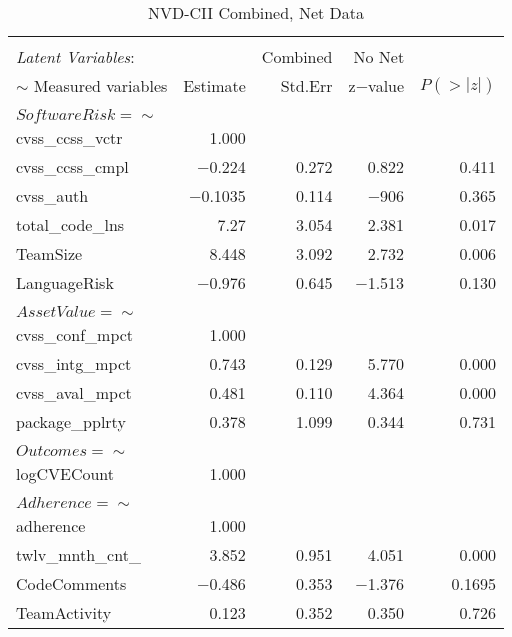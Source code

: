 \begin{table}
	\begin{center}	
		\caption{NVD-CII Combined, Net Data}
		\label{tab:results_combined2}
		\begin{tabular}{l|rrrr}
			\\[-1.8ex]\hline 
			\hline \\[-1.8ex] 
			\textit{Latent Variables}: &  & Combined & No Net & \\  
			$\sim$ Measured variables& Estimate & Std.Err & z$-$value & $P(>|z|)$ \\
			\hline \\[-1.8ex]
			$SoftwareRisk =\sim$  & & & & \\                                   
			cvss\_ccss\_vctr   & 1.000 & &  & \\                             
			cvss\_ccss\_cmpl &  $-$0.224 &   0.272 & 0.822 &   0.411\\
			cvss\_auth     &   $-$0.1035  &  0.114  & $-$906   & 0.365\\
			total\_code\_lns  &  7.27 &   3.054 &   2.381 &   0.017\\
			TeamSize        &  8.448   & 3.092  & 2.732   & 0.006\\
			LanguageRisk    &  $-$0.976  &  0.645   & $-$1.513   & 0.130\\ 
			& & & & \\  
			$AssetValue =\sim$     & & & & \\                                    		
			cvss\_conf\_mpct  &  1.000  &	&	&                  \\
			cvss\_intg\_mpct  &  0.743  &  0.129 &   5.770  &  0.000\\
			cvss\_aval\_mpct  &  0.481 &   0.110 &   4.364 &   0.000\\
			package\_pplrty  &  0.378 &   1.099  &  0.344 &   0.731\\	
			& & & & \\  
			$Outcomes =\sim$    & & & & \\                                     
			logCVECount     &  1.000  & & & \\                          
			& & & & \\  
			$Adherence =\sim$   & & & & \\                                      
			adherence    &     1.000        & & & \\    
			twlv\_mnth\_cnt\_  &  3.852  &  0.951  &  4.051 &   0.000\\
			CodeComments    &  $-$0.486  &  0.353  &  $-$1.376  &  0.1695\\
			TeamActivity    &  0.123  &  0.352 &   0.350 &   0.726\\	
			

\end{tabular}
\end{center}
\end{table}

